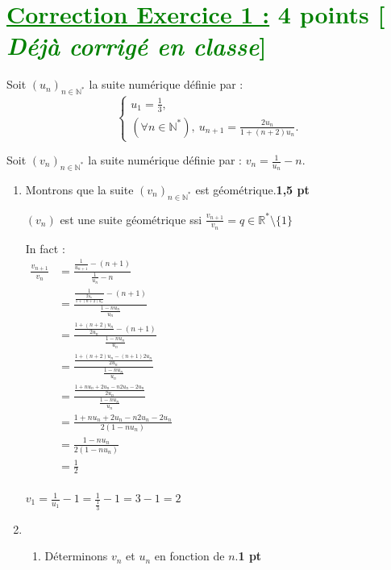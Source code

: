 \documentclass[12pt,a4paper]{article}
\begin{document}
\section*{\textcolor{green}{\underline{Correction Exercice 1 :} 4 points [\textit{ Déjà corrigé en classe}]}}
Soit \((u_n)_{n \in \mathbb{N}^*}\) la suite numérique définie par :
\[
\begin{cases}
u_1 = \frac{1}{3}, \\
(\forall n \in \mathbb{N}^*), \ u_{n+1} = \frac{2u_n}{1 + (n+2)u_n}.
\end{cases}
\]

Soit \((v_n)_{n \in \mathbb{N}^*}\) la suite numérique définie par : \(v_n = \frac{1}{u_n} - n\).

\begin{enumerate}
    \item Montrons que la suite \((v_n)_{n \in \mathbb{N}^*}\) est géométrique.\hfill \textbf{1,5 pt}
    
\((v_n)\) est une suite géométrique ssi $\frac{v_{n+1}}{v_n}=q \in \mathbb{R}^{*}\setminus\{1\}$

In fact : \\
$
\begin{aligned}
\frac{v_{n+1}}{v_n}&=\frac{\frac{1}{u_{n+1}} - (n+1)}{\frac{1}{u_n} - n}\\
									&=\frac{\frac{1}{\frac{2u_n}{1 + (n+2)u_n}} - (n+1)}{\frac{1 - nu_n}{u_n}}\\
									&=\frac{\frac{{1 + (n+2)u_n}}{2u_n} - (n+1)}{\frac{1 - nu_n}{u_n}}\\
									&=\frac{\frac{1 + (n+2)u_n - (n+1)2u_n}{2u_n}}{\frac{1 - nu_n}{u_n}}\\
									&=\frac{\frac{1 + nu_n+2u_n - n2u_n-2u_n}{2u_n}}{\frac{1 - nu_n}{u_n}}\\
									&=\frac{1 + nu_n+2u_n - n2u_n-2u_n}{2(1 - nu_n)}\\
									&=\frac{1 - nu_n}{2(1 - nu_n)}\\
									&=\frac{1}{2}\\
\end{aligned}
$

\( v_1 = \frac{1}{u_1} - 1=\frac{1}{\frac{1}{3}} - 1=3 - 1 =2 \)    
    \item 
    \begin{enumerate}
        \item Déterminons \(v_n\) et \(u_n\) en fonction de \(n\).\hfill \textbf{1 pt}
        

\end{enumerate}
\end{enumerate}
\end{document}
